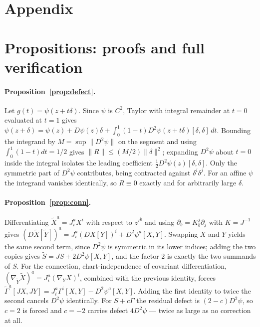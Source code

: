 \documentclass{article}
\begin{document}
\section*{Appendix}

\section{Propositions: proofs and full verification}
\label{app:props}

\paragraph{Proposition~\ref{prop:defect}.} Let $g(t) = \psi(z + t\delta)$. Since $\psi$ is
$C^{2}$, Taylor with integral remainder at $t=0$ evaluated at $t=1$ gives
$\psi(z+\delta) = \psi(z) + D\psi(z)\delta + \int_{0}^{1}(1-t) D^{2}\psi(z+t\delta)[\delta,\delta]\,dt$.
Bounding the integrand by $M = \sup\|D^{2}\psi\|$ on the segment and using
$\int_{0}^{1}(1-t)dt = 1/2$ gives $\|R\| \le (M/2)\|\delta\|^{2}$; expanding
$D^{2}\psi$ about $t=0$ inside the integral isolates the leading coefficient
$\tfrac12 D^{2}\psi(z)[\delta,\delta]$. Only the symmetric part of $D^{2}\psi$ contributes,
being contracted against $\delta^{i}\delta^{j}$. For an affine $\psi$ the integrand vanishes
identically, so $R \equiv 0$ exactly and for arbitrarily large $\delta$.

\paragraph{Proposition~\ref{prop:conn}.} Differentiating $\tilde X^{a} = J^{a}_{i}X^{i}$ with
respect to $z'^{b}$ and using $\partial_{b} = K^{j}_{b}\partial_{j}$ with $K = J^{-1}$ gives
$(D\tilde X[\tilde Y])^{a} = J^{a}_{i}(DX[Y])^{i} + D^{2}\psi^{a}[X,Y]$. Swapping $X$ and $Y$
yields the same second term, since $D^{2}\psi$ is symmetric in its lower indices; adding the
two copies gives $\tilde S = JS + 2D^{2}\psi[X,Y]$, and the factor $2$ is exactly the two
summands of $S$. For the connection, chart-independence of covariant differentiation,
$(\nabla_{\tilde Y}\tilde X)^{a} = J^{a}_{i}(\nabla_{Y}X)^{i}$, combined with the previous
identity, forces
$\tilde\Gamma^{a}[JX, JY] = J^{a}_{i}\Gamma^{i}[X,Y] - D^{2}\psi^{a}[X,Y]$. Adding the first
identity to twice the second cancels $D^{2}\psi$ identically. For $S + c\Gamma$ the residual
defect is $(2-c)D^{2}\psi$, so $c=2$ is forced and $c=-2$ carries defect $4D^{2}\psi$ ---
twice as large as no correction at all.
\end{document}
